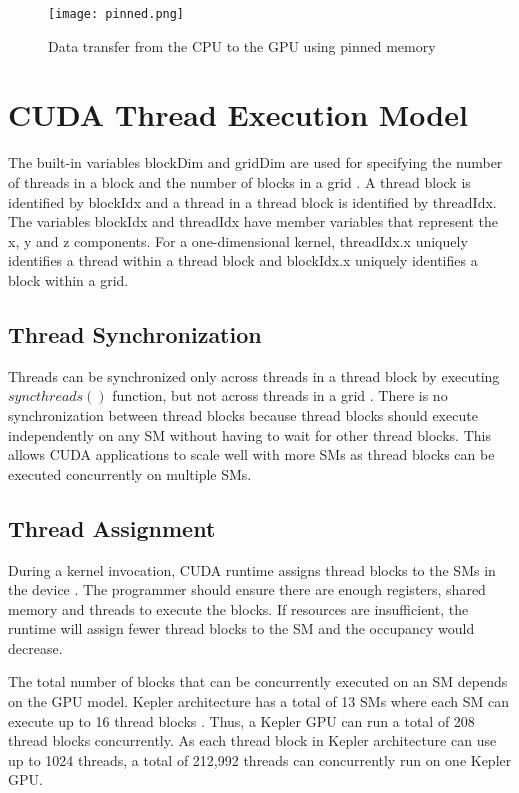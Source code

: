 \begin{figure}[H]
	\centering
	\texttt{[image: pinned.png]}
	\caption{Data transfer from the CPU to the GPU using pinned memory}
	\label{fig:pinned}
\end{figure}
\squeezeup

\section{CUDA Thread Execution Model}

The built-in variables blockDim and gridDim are used for specifying the number of threads in a block and the number of blocks in a grid \cite{bib5}. A thread block is identified by blockIdx and a thread in a thread block is identified by threadIdx. The variables blockIdx and threadIdx have member variables that represent the x, y and z components. For a one-dimensional kernel, threadIdx.x uniquely identifies a thread within a thread block and blockIdx.x uniquely identifies a block within a grid.

\subsection{Thread Synchronization}
Threads can be synchronized only across threads in a thread block by executing $syncthreads()$ function, but not across threads in a grid \cite{bib5}. There is no synchronization between thread blocks because thread blocks should execute independently on any SM without having to wait for other thread blocks. This allows CUDA applications to scale well with more SMs as thread blocks can be executed concurrently on multiple SMs.

\subsection{Thread Assignment}
During a kernel invocation, CUDA runtime assigns thread blocks to the SMs in the device \cite{bib5}. The programmer should ensure there are enough registers, shared memory and threads to execute the blocks. If resources are insufficient, the runtime will assign fewer thread blocks to the SM and the occupancy would decrease.

The total number of blocks that can be concurrently executed on an SM depends on the GPU model. Kepler architecture has a total of 13 SMs where each SM can execute up to 16 thread blocks \cite{bib5}. Thus, a Kepler GPU can run a total of 208 thread blocks concurrently. As each thread block in Kepler architecture can use up to 1024 threads, a total of 212,992 threads can concurrently run on one Kepler GPU.

